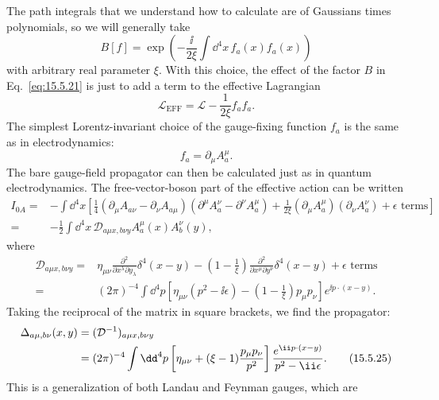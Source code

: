The path integrals that we understand how to calculate are of Gaussians times
polynomials, so we will generally take
\begin{equation}
  B[f]=\exp\left(-\frac{\ii}{2\xi}\int \dd^4x\,f_a(x)f_a(x)\right)
  \tag{15.5.22}\label{eq:15.5.22}
\end{equation}
with arbitrary real parameter $\xi$. With this choice, the effect of the factor
$B$ in Eq.~\eqref{eq:15.5.21} is just to add a term to the effective Lagrangian
\begin{equation}
  \mathcal L_{\mathrm{EFF}}=\mathcal L-\frac{1}{2\xi}f_a f_a.
  \tag{15.5.23}\label{eq:15.5.23}
\end{equation}
The simplest Lorentz-invariant choice of the gauge-fixing function $f_a$
is the same as in electrodynamics:
\begin{equation}
  f_a=\partial_\mu A_a^\mu.
  \tag{15.5.24}\label{eq:15.5.24}
\end{equation}
The bare gauge-field propagator can then be calculated just as in quantum
electrodynamics. The free-vector-boson part of the effective action can be
written
\begin{align*}
  I_{0A}={}&-\int \dd^4x\left[\frac14
  (\partial_\mu A_{a\nu}-\partial_\nu A_{a\mu})
  (\partial^\mu A_a^\nu-\partial^\nu A_a^\mu)
  +\frac{1}{2\xi}(\partial_\mu A_a^\mu)
  (\partial_\nu A_a^\nu)+\epsilon\text{ terms}\right]
  \\
  ={}&-\frac12\int \dd^4x\,
  \mathcal D_{a\mu x,b\nu y}A_a^\mu(x)A_b^\nu(y),
\end{align*}
where
\begin{align*}
  \mathcal D_{a\mu x,b\nu y}
  ={}&\eta_{\mu\nu}\frac{\partial^2}{\partial x^\lambda\partial y_\lambda}
  \delta^4(x-y)
  -\left(1-\frac1\xi\right)
  \frac{\partial^2}{\partial x^\mu\partial y^\nu}\delta^4(x-y)
  +\epsilon\text{ terms}
  \\
  ={}&(2\pi)^{-4}\int \dd^4p\left[\eta_{\mu\nu}(p^2-\ii\epsilon)
  -\left(1-\frac1\xi\right)p_\mu p_\nu\right]e^{\ii p\cdot(x-y)}.
\end{align*}
Taking the reciprocal of the matrix in square brackets, we find the propagator:
\begin{align}
  \Delta_{a\mu,b\nu}(x,y)
  &=(\mathcal D^{-1})_{a\mu x,b\nu y}
  \notag\\
  &=(2\pi)^{-4}\int \dd^4p\left[\eta_{\mu\nu}
  +(\xi-1)\frac{p_\mu p_\nu}{p^2}\right]
 \frac{e^{\ii p\cdot(x-y)}}{p^2-\ii\epsilon}.
  \tag{15.5.25}\label{eq:15.5.25}
\end{align}
This is a generalization of both Landau and Feynman gauges, which are
